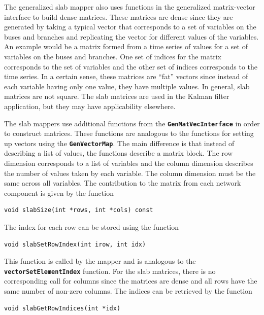 \documentclass[12pt]{report} %
\begin{document}
The generalized slab mapper also uses functions in the generalized matrix-vector interface to build dense matrices. These matrices are dense since they are generated by taking a typical vector that corresponds to a set of variables on the buses and branches and replicating the vector for different values of the variables. An example would be a matrix formed from a time series of values for a set of variables on the buses and branches. One set of indices for the matrix corresponds to the set of variables and the other set of indices corresponds to the time series. In a certain sense, these matrices are ``fat'' vectors since instead of each variable having only one value, they have multiple values. In general, slab matrices are not square. The slab matrices are used in the Kalman filter application, but they may have applicability elsewhere.

The slab mappers use additional functions from the \texttt{\textbf{GenMatVecInterface}} in order to construct matrices. These functions are analogous to the functions for setting up vectors using the \texttt{\textbf{GenVectorMap}}. The main difference is that instead of describing a list of values, the functions describe a matrix block. The row dimension corresponds to a list of variables and the column dimension describes the number of values taken by each variable. The column dimension must be the same across all variables. The contribution to the matrix from each network component is given by the function

{
\color{red}
\begin{Verbatim}[fontseries=b]
void slabSize(int *rows, int *cols) const
\end{Verbatim}
}

The index for each row can be stored using the function

{
\color{red}
\begin{Verbatim}[fontseries=b]
void slabSetRowIndex(int irow, int idx)
\end{Verbatim}
}

This function is called by the mapper and is analogous to the \texttt{\textbf{vectorSetElementIndex}} function. For the slab matrices, there is no corresponding call for columns since the matrices are dense and all rows have the same number of non-zero columns. The indices can be retrieved by the function

{
\color{red}
\begin{Verbatim}[fontseries=b]
void slabGetRowIndices(int *idx)
\end{Verbatim}
}
\end{document}
